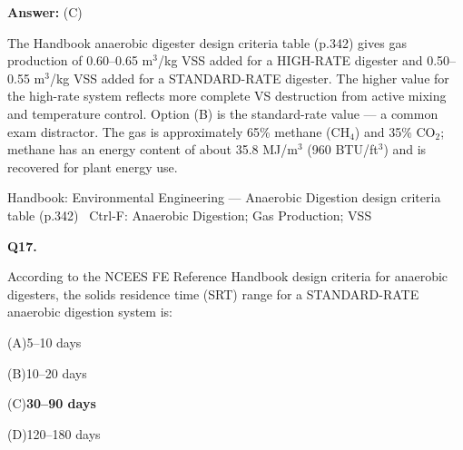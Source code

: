 \documentclass[11pt]{article}
\newcommand{\correct}[1]{\textbf{#1}\;{\color{accent}$\checkmark$}}
\newcommand{\optline}[2]{\par\noindent\hspace{1.2em}(#1)\hspace{0.6em}#2}
\begin{document}
\vspace{2pt}\par\noindent\colorbox{boxbg}{\parbox{\dimexpr\linewidth-2\fboxsep\relax}{%
\vspace{2pt}\textbf{Answer:} (C)\par\vspace{2pt}
{\small The Handbook anaerobic digester design criteria table (p.342) gives gas production of 0.60--0.65 m$^3$/kg VSS added for a HIGH-RATE digester and 0.50--0.55 m$^3$/kg VSS added for a STANDARD-RATE digester. The higher value for the high-rate system reflects more complete VS destruction from active mixing and temperature control. Option (B) is the standard-rate value --- a common exam distractor. The gas is approximately 65\% methane (CH$_4$) and 35\% CO$_2$; methane has an energy content of about 35.8 MJ/m$^3$ (960 BTU/ft$^3$) and is recovered for plant energy use.}\par\vspace{2pt}
{\footnotesize\color{soft}Handbook: Environmental Engineering --- Anaerobic Digestion design criteria table (p.342) \textbullet\ Ctrl-F: Anaerobic Digestion; Gas Production; VSS}\vspace{2pt}
}}
\vspace{9pt}
\filbreak
\textbf{\color{accent}Q17.}\par\vspace{2pt}
According to the NCEES FE Reference Handbook design criteria for anaerobic digesters, the solids residence time (SRT) range for a STANDARD-RATE anaerobic digestion system is:\par\vspace{3pt}
\optline{A}{5--10 days}
\optline{B}{10--20 days}
\optline{C}{\correct{30--90 days}}
\optline{D}{120--180 days}
\par\vspace{3pt}
\end{document}

